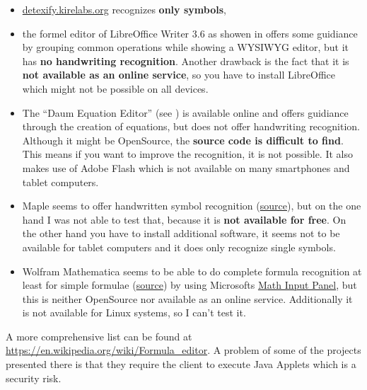 \documentclass[a4paper]{scrartcl}
\begin{document}
    \begin{itemize}
        \item \href{http://detexify.kirelabs.org/classify.html}{detexify.kirelabs.org}
              recognizes \textbf{only symbols},
        \item the formel editor of LibreOffice Writer 3.6 as showen 
              in  offers some
              guidiance by grouping common operations while showing
              a WYSIWYG editor, but it has \textbf{no handwriting recognition}.
              Another drawback is the fact that it is \textbf{not available 
              as an online service}, so you have to install LibreOffice
              which might not be possible on all devices.
        \item The \enquote{Daum Equation Editor} (see ) is available online
              and offers guidiance through the creation of equations,
              but does not offer handwriting recognition. Although
              it might be OpenSource, the \textbf{source code is difficult to
              find}. This means if you want to improve the recognition,
              it is not possible. It also makes use of Adobe Flash 
              which is not available on many smartphones and tablet
              computers.
        \item Maple seems to offer handwritten symbol recognition (\href{http://www.maplesoft.com/products/maple/features/handwritten.aspx}{source}),
              but on the one hand I was not able to test that, because
              it is \textbf{not available for free}. On the other hand you 
              have to install additional software, it seems not to be
              available for tablet computers and it does only recognize
              single symbols.
        \item Wolfram Mathematica seems to be able to do complete
              formula recognition at least for simple formulae (\href{http://reference.wolfram.com/mathematica/tutorial/HandwrittenMathRecognition.html}{source})
              by using Microsofts \href{http://windows.microsoft.com/en-ph/windows7/use-math-input-panel-to-write-and-correct-math-equations}{Math Input Panel},
              but this is neither OpenSource nor available as an
              online service. Additionally it is not
              available for Linux systems, so I can't test it.
    \end{itemize}

    A more comprehensive list can be found at \href{https://en.wikipedia.org/wiki/Formula_editor}{https://en.wikipedia.org/wiki/Formula\_editor}.
    A problem of some of the projects presented there is that they
    require the client to execute Java Applets which is a security 
    risk.
\end{document}
